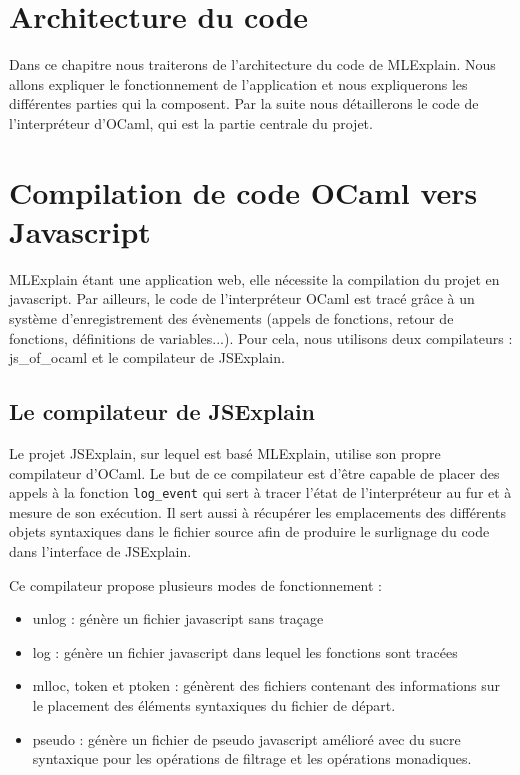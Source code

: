 \documentclass{easychair}
\begin{document}
\section{Architecture du code}
Dans ce chapitre nous traiterons de l'architecture du code de MLExplain. Nous 
allons expliquer le fonctionnement de l'application et nous expliquerons les 
différentes parties qui la composent. Par la suite nous détaillerons le code de 
l'interpréteur d'OCaml, qui est la partie centrale du projet.

\section{Compilation de code OCaml vers Javascript}
MLExplain étant une application web, elle nécessite la compilation du projet en 
javascript. Par ailleurs, le code de l'interpréteur OCaml est tracé grâce à un 
système d'enregistrement des évènements (appels de fonctions, retour de 
fonctions, définitions de variables...). Pour cela, nous utilisons deux 
compilateurs : js\_of\_ocaml et le compilateur de JSExplain.

\subsection{Le compilateur de JSExplain}
Le projet JSExplain, sur lequel est basé MLExplain, utilise son propre 
compilateur d'OCaml. Le but de ce compilateur est d'être capable de placer des 
appels à la fonction \verb|log_event| qui sert à tracer l'état de l'interpréteur 
au fur et à mesure de son exécution. Il sert aussi à récupérer les emplacements 
des différents objets syntaxiques dans le fichier source afin de produire le 
surlignage du code dans l'interface de JSExplain.

Ce compilateur propose plusieurs modes de fonctionnement :

\begin{itemize}
 \item unlog : génère un fichier javascript sans traçage
 \item log : génère un fichier javascript dans lequel les fonctions sont tracées
 \item mlloc, token et ptoken : génèrent des fichiers contenant des informations
sur le placement des éléments syntaxiques du fichier de départ.
 \item pseudo : génère un fichier de pseudo javascript amélioré avec du sucre 
syntaxique pour les opérations de filtrage et les opérations monadiques.
\end{itemize}
\end{document}
